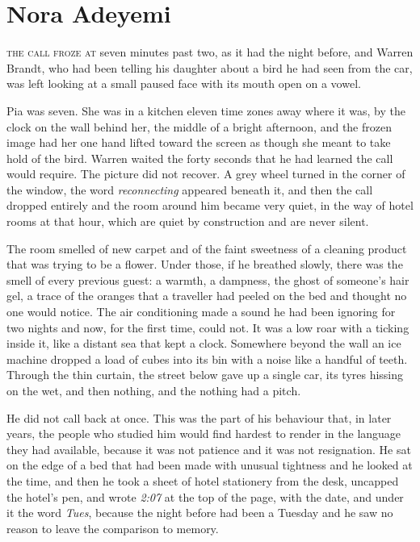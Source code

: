 \part{Nora Adeyemi}


\textsc{the call froze at} seven minutes past two, as it had the night before, and Warren Brandt, who had been telling his daughter about a bird he had seen from the car, was left looking at a small paused face with its mouth open on a vowel.

Pia was seven. She was in a kitchen eleven time zones away where it was, by the clock on the wall behind her, the middle of a bright afternoon, and the frozen image had her one hand lifted toward the screen as though she meant to take hold of the bird. Warren waited the forty seconds that he had learned the call would require. The picture did not recover. A grey wheel turned in the corner of the window, the word \emph{reconnecting} appeared beneath it, and then the call dropped entirely and the room around him became very quiet, in the way of hotel rooms at that hour, which are quiet by construction and are never silent.

The room smelled of new carpet and of the faint sweetness of a cleaning product that was trying to be a flower. Under those, if he breathed slowly, there was the smell of every previous guest: a warmth, a dampness, the ghost of someone's hair gel, a trace of the oranges that a traveller had peeled on the bed and thought no one would notice. The air conditioning made a sound he had been ignoring for two nights and now, for the first time, could not. It was a low roar with a ticking inside it, like a distant sea that kept a clock. Somewhere beyond the wall an ice machine dropped a load of cubes into its bin with a noise like a handful of teeth. Through the thin curtain, the street below gave up a single car, its tyres hissing on the wet, and then nothing, and the nothing had a pitch.

He did not call back at once. This was the part of his behaviour that, in later years, the people who studied him would find hardest to render in the language they had available, because it was not patience and it was not resignation. He sat on the edge of a bed that had been made with unusual tightness and he looked at the time, and then he took a sheet of hotel stationery from the desk, uncapped the hotel's pen, and wrote \emph{2:07} at the top of the page, with the date, and under it the word \emph{Tues}, because the night before had been a Tuesday and he saw no reason to leave the comparison to memory.

